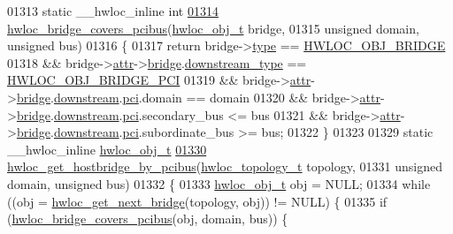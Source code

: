 \begin{DoxyCode}
{{01313 \textcolor{keyword}{static} \_\_hwloc\_inline \textcolor{keywordtype}{int}
\hypertarget{a00031_source_l01314}{}\hyperlink{a00064_gaef22d6bf5cb0b7f13a863780126a8cb7}{01314} \hyperlink{a00064_gaef22d6bf5cb0b7f13a863780126a8cb7}{hwloc_bridge_covers_pcibus}(\hyperlink{a00016}{hwloc_obj_t} bridge,
01315                            \textcolor{keywordtype}{unsigned} domain, \textcolor{keywordtype}{unsigned} bus)
01316 \{
01317   \textcolor{keywordflow}{return} bridge->\hyperlink{a00016_acc4f0803f244867e68fe0036800be5de}{type} == \hyperlink{a00041_ggacd37bb612667dc437d66bfb175a8dc55a6825f10895fea60aca7a6ba9fe273db0}{HWLOC_OBJ_BRIDGE}
01318     && bridge->\hyperlink{a00016_accd40e29f71f19e88db62ea3df02adc8}{attr}->\hyperlink{a00017_adbdf280699dd84c7619cd8d9edc0d958}{bridge}.\hyperlink{a00012_ac6a169b672d0e9f75756fd5665828b93}{downstream_type} == \hyperlink{a00041_gga48a4803c72574191d7ead1c62aaf9860a8f3b4cecf3dab6073d74696d10863c60}{HWLOC_OBJ_BRIDGE_PCI}
01319     && bridge->\hyperlink{a00016_accd40e29f71f19e88db62ea3df02adc8}{attr}->\hyperlink{a00017_adbdf280699dd84c7619cd8d9edc0d958}{bridge}.\hyperlink{a00012_acaf1ae02e37182bbb6966f8c4f35e499}{downstream}.\hyperlink{a00012_ab5c564e7c95b747dae9eb84ec0a2c31e}{pci}.domain == domain
01320     && bridge->\hyperlink{a00016_accd40e29f71f19e88db62ea3df02adc8}{attr}->\hyperlink{a00017_adbdf280699dd84c7619cd8d9edc0d958}{bridge}.\hyperlink{a00012_acaf1ae02e37182bbb6966f8c4f35e499}{downstream}.\hyperlink{a00012_ab5c564e7c95b747dae9eb84ec0a2c31e}{pci}.secondary\_bus <= bus
01321     && bridge->\hyperlink{a00016_accd40e29f71f19e88db62ea3df02adc8}{attr}->\hyperlink{a00017_adbdf280699dd84c7619cd8d9edc0d958}{bridge}.\hyperlink{a00012_acaf1ae02e37182bbb6966f8c4f35e499}{downstream}.\hyperlink{a00012_ab5c564e7c95b747dae9eb84ec0a2c31e}{pci}.subordinate\_bus >= bus;
01322 \}
01323 
01329 \textcolor{keyword}{static} \_\_hwloc\_inline \hyperlink{a00016}{hwloc_obj_t}
\hypertarget{a00031_source_l01330}{}\hyperlink{a00064_ga81d4f68afbd68d94eb70d4f5c603eff5}{01330} \hyperlink{a00064_ga81d4f68afbd68d94eb70d4f5c603eff5}{hwloc_get_hostbridge_by_pcibus}(\hyperlink{a00039_ga9d1e76ee15a7dee158b786c30b6a6e38}{hwloc_topology_t} topology,
01331                                \textcolor{keywordtype}{unsigned} domain, \textcolor{keywordtype}{unsigned} bus)
01332 \{
01333   \hyperlink{a00016}{hwloc_obj_t} obj = NULL;
01334   \textcolor{keywordflow}{while} ((obj = \hyperlink{a00064_ga2bd3f856d0fc3c6c02642c17d763b823}{hwloc_get_next_bridge}(topology, obj)) != NULL) \{
01335     \textcolor{keywordflow}{if} (\hyperlink{a00064_gaef22d6bf5cb0b7f13a863780126a8cb7}{hwloc_bridge_covers_pcibus}(obj, domain, bus)) \{
}}
\end{DoxyCode}
